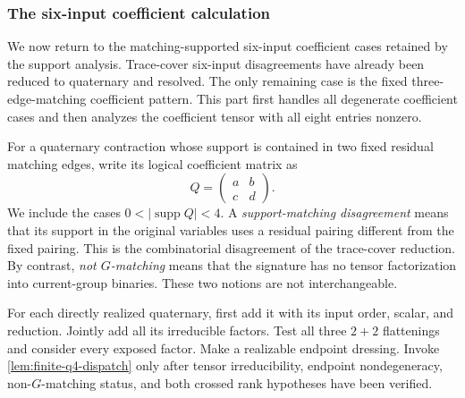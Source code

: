 \documentclass[11pt,letterpaper,onecolumn]{article}
\theoremstyle{plain}
\theoremstyle{definition}
\theoremstyle{remark}
\newcommand{\supp}{\operatorname{supp}}
\begin{document}
\subsubsection{The six-input coefficient calculation}
\label{proofsubsec:nd-six-port}

We now return to the matching-supported six-input coefficient cases retained
by the support analysis.  Trace-cover six-input disagreements have already been
reduced to quaternary and resolved. The only remaining case is the fixed
three-edge-matching coefficient pattern.  This part first handles
all degenerate coefficient cases and then analyzes the coefficient tensor with all eight entries nonzero.

For a quaternary contraction whose support is contained in two fixed residual
matching edges, write its logical coefficient matrix as
\[
 Q=\begin{pmatrix}a&b\\c&d\end{pmatrix}.
\]
We include the cases \(0<|\supp Q|<4\).  A \emph{support-matching disagreement} means that its support in the original variables uses a residual pairing different from the fixed pairing. This is
the combinatorial disagreement of the trace-cover reduction.  By contrast,
\emph{not \(G\)-matching} means that the signature has no tensor
factorization into current-group binaries.  These two notions are not
interchangeable.

For each directly realized quaternary, first add it with its input order, scalar, and reduction. Jointly add all its irreducible factors. Test all three \(2+2\)
flattenings and consider every exposed factor. Make a realizable endpoint
dressing. Invoke \cref{lem:finite-q4-dispatch} only after tensor
irreducibility, endpoint nondegeneracy, non-\(G\)-matching status, and both
crossed rank hypotheses have been verified.
\end{document}
